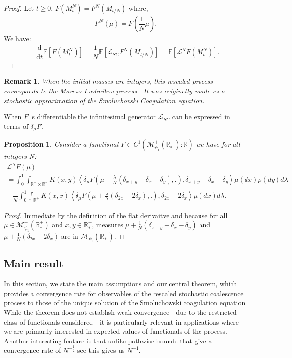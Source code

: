 \documentclass[11pt,a4paper]{article}
\newcommand{\RR}{\mathbb{R}}
\newcommand{\RRP}{\mathbb{R}^+_*}
\newcommand{\MC}{\mathcal{M}}
\newcommand{\LC}{\mathcal{L}}
\newcommand{\E}[1]{\mathbb{E}\left[#1\right]}
\newcommand{\dd}{\mathop{}\!\mathrm{d}}
\newtheorem{remark}[theorem]{Remark}
\newtheorem{proposition}[theorem]{Proposition}
\begin{document}
\begin{proof}
    Let $t \geq 0$, $F(M^N_t) = F^N(M_{t/N})$ where,
    \begin{align*}
        F^N(\mu) = F\left(\dfrac{1}{N}\mu\right).
    \end{align*}
    We have:
    \begin{align*}
        \dfrac{\dd}{\dd t}\E{F(M^N_t)}  = \dfrac{1}{N}\E{\LC_{SC} F^N\left(M_{t/N}\right)} =  \E{\LC^N F(M^N_t)}.
    \end{align*}
\end{proof}

\begin{remark}
   When the initial masses are integers, this rescaled process corresponds to the Marcus-Lushnikov process \cite{marcus1968stochastic,lushnikov1978coagulation}. It was originally made as a stochastic approximation of the Smoluchovski Coagulation equation.
\end{remark}
When $F$ is differentiable the infinitesimal generator $\LC_{SC}$ can be expressed in terms of $\delta_\mu F$.
\begin{proposition}\label{prop:SC_gen_differentiable}
    Consider a functional $F \in C^1(\MC_{\psi_1}^+\left(\RRP \right):\RR)$ we have for all integers $N$:
    \begin{multline*}
        \LC^N F(\mu)\\
         = \int_0^1 \int_{\RR^+ \times \RR^+} K(x,y)\left\langle  \delta_\mu F\left(\mu + \frac{\lambda}{N}\left(\delta_{x + y} - \delta_x - \delta_y \right),.\right),\delta_{x+y} - \delta_x - \delta_y\right\rangle\mu(dx)\mu(dy)d\lambda \\
        -\dfrac{1}{N}\int_0^1\int_{\RR^+} K(x,x)\left\langle  \delta_\mu F\left(\mu + \frac{\lambda}{N}\left(\delta_{2x} - 2\delta_x \right),.\right),\delta_{2x} - 2\delta_x \right\rangle\mu(dx)d\lambda.
    \end{multline*}
\end{proposition}
\begin{proof}
    Immediate by the definition of the flat derivaitve and because for all $\mu \in \MC_{\psi_1}^+\left(\RRP \right)$ and $x,y \in \RRP$, measures $\mu + \frac{1}{N}\left(\delta_{x + y} - \delta_x - \delta_y\right)$ and $\mu + \frac{1}{N}\left(\delta_{2x} - 2\delta_x \right)$ are in $\MC_{\psi_1}\left(\RRP \right)$.
\end{proof}

\subsection{Main result}
In this section, we state the main assumptions and our central theorem, which provides a convergence rate for observables of the rescaled stochastic coalescence process to those of the unique solution of the Smoluchowski coagulation equation. While the theorem does not establish weak convergence—due to the restricted class of functionals considered—it is particularly relevant in applications where we are primarily interested in expected values of functionals of the process. Another interesting feature is that unlike pathwise bounds that give a convergence rate of $N^{-\frac{1}{2}}$ see \cite{cepedaSmoluchowskisEquationRate2011a} this gives us $N^{-1}$.
\end{document}
